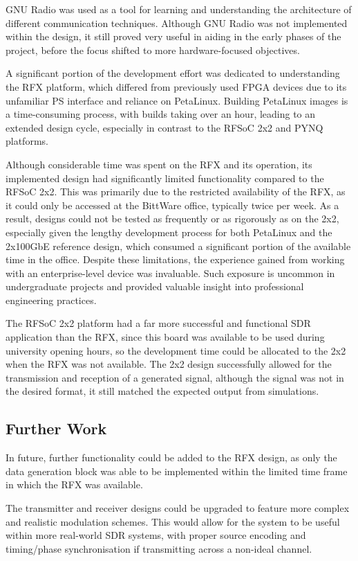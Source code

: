 \documentclass[12pt, a4paper]{article}
\begin{document}
GNU Radio was used as a tool for learning and understanding the architecture of different communication techniques. Although GNU Radio was not implemented within the design, it still proved very useful in aiding in the early phases of the project, before the focus shifted to more hardware-focused objectives.

A significant portion of the development effort was dedicated to understanding the RFX platform, which differed from previously used FPGA devices due to its unfamiliar PS interface and reliance on PetaLinux. Building PetaLinux images is a time-consuming process, with builds taking over an hour, leading to an extended design cycle, especially in contrast to the RFSoC 2x2 and PYNQ platforms.

Although considerable time was spent on the RFX and its operation, its implemented design had significantly limited functionality compared to the RFSoC 2x2. This was primarily due to the restricted availability of the RFX, as it could only be accessed at the BittWare office, typically twice per week. As a result, designs could not be tested as frequently or as rigorously as on the 2x2, especially given the lengthy development process for both PetaLinux and the 2x100GbE reference design, which consumed a significant portion of the available time in the office. Despite these limitations, the experience gained from working with an enterprise-level device was invaluable. Such exposure is uncommon in undergraduate projects and provided valuable insight into professional engineering practices.

The RFSoC 2x2 platform had a far more successful and functional SDR application than the RFX, since this board was available to be used during university opening hours, so the development time could be allocated to the 2x2 when the RFX was not available. The 2x2 design successfully allowed for the transmission and reception of a generated signal, although the signal was not in the desired format, it still matched the expected output from simulations.

\subsection{Further Work}

In future, further functionality could be added to the RFX design, as only the data generation block was able to be implemented within the limited time frame in which the RFX was available.

The transmitter and receiver designs could be upgraded to feature more complex and realistic modulation schemes. This would allow for the system to be useful within more real-world SDR systems, with proper source encoding and timing/phase synchronisation if transmitting across a non-ideal channel.
\end{document}
